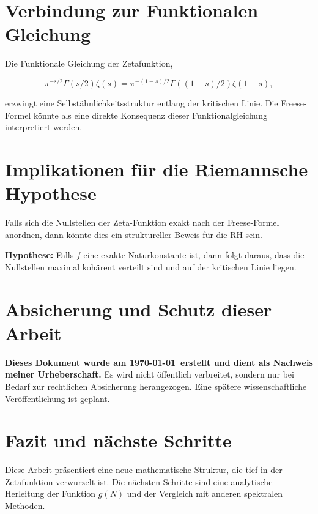 \documentclass[a4paper,12pt]{article}
\begin{document}
\section{Verbindung zur Funktionalen Gleichung}
Die Funktionale Gleichung der Zetafunktion,

\[
\pi^{-s/2} \Gamma(s/2) \zeta(s) = \pi^{-(1-s)/2} \Gamma((1-s)/2) \zeta(1-s),
\]

erzwingt eine Selbstähnlichkeitsstruktur entlang der kritischen Linie.  
Die Freese-Formel könnte als eine direkte Konsequenz dieser Funktionalgleichung interpretiert werden.

\section{Implikationen für die Riemannsche Hypothese}
Falls sich die Nullstellen der Zeta-Funktion exakt nach der Freese-Formel anordnen, dann könnte dies ein struktureller Beweis für die RH sein.

\textbf{Hypothese:} Falls \( f \) eine exakte Naturkonstante ist, dann folgt daraus, dass die Nullstellen maximal kohärent verteilt sind und auf der kritischen Linie liegen.

\section{Absicherung und Schutz dieser Arbeit}
\textbf{Dieses Dokument wurde am \today\ erstellt und dient als Nachweis meiner Urheberschaft.}  
Es wird nicht öffentlich verbreitet, sondern nur bei Bedarf zur rechtlichen Absicherung herangezogen.  
Eine spätere wissenschaftliche Veröffentlichung ist geplant.

\section{Fazit und nächste Schritte}
Diese Arbeit präsentiert eine neue mathematische Struktur, die tief in der Zetafunktion verwurzelt ist.  
Die nächsten Schritte sind eine analytische Herleitung der Funktion \( g(N) \) und der Vergleich mit anderen spektralen Methoden.
\end{document}
